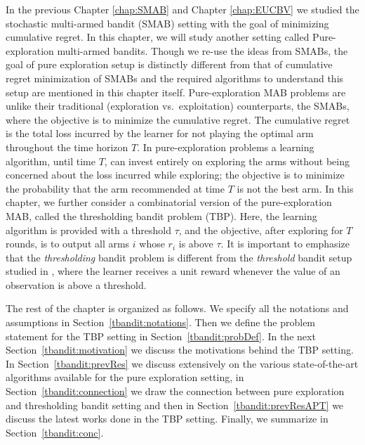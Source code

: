In the previous Chapter \ref{chap:SMAB} and Chapter \ref{chap:EUCBV} we studied the stochastic multi-armed bandit (SMAB) setting with the goal of minimizing cumulative regret. In this chapter, we will study another setting called Pure-exploration multi-armed bandits. Though we re-use the ideas from SMABs, the goal of pure exploration setup is distinctly different from that of cumulative regret minimization of SMABs and the required algorithms to understand this setup are mentioned in this chapter itself. Pure-exploration MAB problems are unlike their traditional (exploration vs.\ exploitation)  counterparts, the SMABs, where the objective is to minimize the cumulative regret. The cumulative regret is the total loss incurred by the learner for not playing the optimal arm throughout the time horizon $T$. 
    In pure-exploration problems a learning algorithm, until time $T$, can invest entirely on exploring the arms without being concerned about the loss incurred while exploring; the objective is to minimize the probability that the arm recommended at time $T$ is not the best arm.  In this chapter, we further consider a combinatorial version of the pure-exploration MAB, called the thresholding bandit problem (TBP).  Here, the learning algorithm is provided with a threshold $\tau$, and the objective, after exploring for $T$ rounds, is to output all arms $i$ whose $r_{i}$ is above $\tau$. 
It is important to emphasize that the \emph{thresholding} bandit problem is different from the \emph{threshold} bandit setup studied in \cite{abernethy2016threshold}, where the learner receives a unit reward whenever the value of an observation is above a threshold. 


    The rest of the chapter is organized as follows. We specify all the notations and assumptions in Section~\ref{tbandit:notations}. Then we define the problem statement for the TBP setting in Section~\ref{tbandit:probDef}. In the next Section~\ref{tbandit:motivation} we discuss the motivations behind the TBP setting. In Section~\ref{tbandit:prevRes} we discuss extensively on the various state-of-the-art algorithms available for the pure exploration setting, in Section~\ref{tbandit:connection} we draw the connection between pure exploration and thresholding bandit setting and then in Section~\ref{tbandit:prevResAPT} we discuss the latest works done in the TBP setting. Finally, we summarize in Section~\ref{tbandit:conc}.

